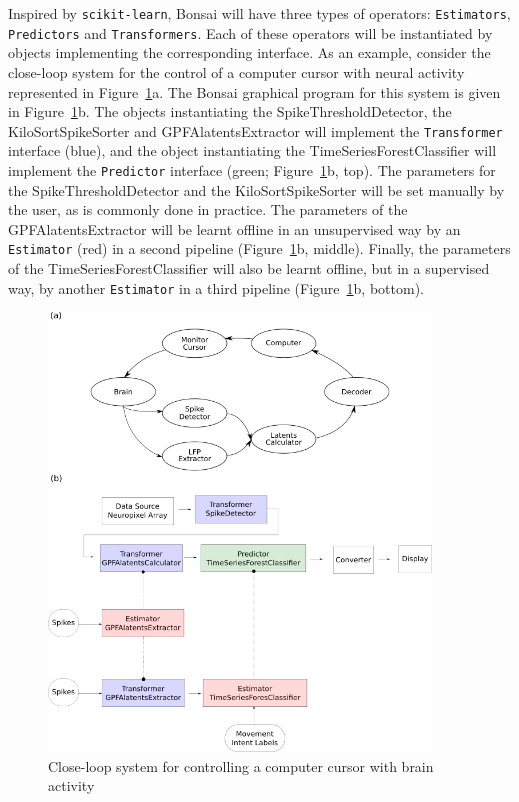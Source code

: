 Inspired by \texttt{scikit-learn}, Bonsai will have three types of operators:
\texttt{Estimators}, \texttt{Predictors} and \texttt{Transformers}. Each of
these operators will be instantiated by objects implementing the corresponding
interface.
%
As an example, consider the close-loop system for the control of a computer
cursor with neural activity represented in Figure~\ref{fig:bci}a. The Bonsai
graphical program for this system is given in Figure~\ref{fig:bci}b. The
objects instantiating the SpikeThresholdDetector, the KiloSortSpikeSorter and
GPFAlatentsExtractor will implement the \texttt{Transformer} interface (blue),
and the object instantiating the TimeSeriesForestClassifier will implement the
\texttt{Predictor} interface (green; Figure~\ref{fig:bci}b, top).
%
The parameters for the SpikeThresholdDetector and the KiloSortSpikeSorter will
be set manually by the user, as is commonly done in practice. The parameters of
the GPFAlatentsExtractor will be learnt offline in an unsupervised way by an
\texttt{Estimator} (red) in a second pipeline (Figure~\ref{fig:bci}b, middle).
Finally, the parameters of the TimeSeriesForestClassifier will also be learnt
offline, but in a supervised way, by another \texttt{Estimator} in a third
pipeline (Figure~\ref{fig:bci}b, bottom).

\begin{figure}
   \begin{center}
       \includegraphics[width=4in]{figures/bci.png}
       \caption{Close-loop system for controlling a computer cursor with brain activity}
     \label{fig:bci}
   \end{center}
\end{figure}

